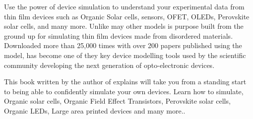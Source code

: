 \newpage
\titleformat{\chapter}{}{}{0em}{\bf\LARGE}

\color{white}


Use the power of device simulation to understand your experimental data from thin film devices such as Organic Solar cells, sensors, OFET, OLEDs, Perovskite solar cells, and many more. Unlike may other models \simname is purpose built from the ground up for simulating thin film devices made from disordered materials. Downloaded more than 25,000 times with over 200 papers published using the model, \simname has become one of they key device modelling tools used by the scientific community developing the next generation of opto-electronic devices.

This book written by the author of \simname explains will take you from a standing start to being able to confidently simulate your own devices. Learn how to simulate, Organic solar cells, Organic Field Effect Transistors, Perovskite solar cells, Organic LEDs, Large area printed devices
 and many more..

\addtolength{\wpXoffset}{-22cm}
\addtolength{\wpYoffset}{0cm}


